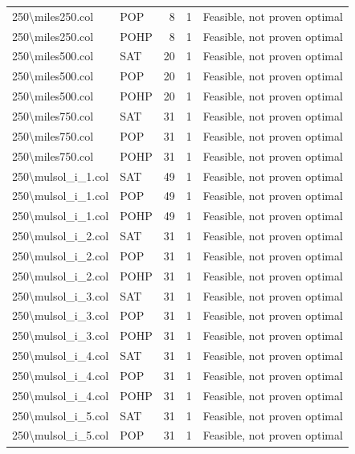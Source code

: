 \begin{longtable}{llrrl}
250\textbackslash{}miles250.col & POP & 8 & 1 & Feasible, not proven optimal \\
250\textbackslash{}miles250.col & POHP & 8 & 1 & Feasible, not proven optimal \\
250\textbackslash{}miles500.col & SAT & 20 & 1 & Feasible, not proven optimal \\
250\textbackslash{}miles500.col & POP & 20 & 1 & Feasible, not proven optimal \\
250\textbackslash{}miles500.col & POHP & 20 & 1 & Feasible, not proven optimal \\
250\textbackslash{}miles750.col & SAT & 31 & 1 & Feasible, not proven optimal \\
250\textbackslash{}miles750.col & POP & 31 & 1 & Feasible, not proven optimal \\
250\textbackslash{}miles750.col & POHP & 31 & 1 & Feasible, not proven optimal \\
250\textbackslash{}mulsol\_i\_1.col & SAT & 49 & 1 & Feasible, not proven optimal \\
250\textbackslash{}mulsol\_i\_1.col & POP & 49 & 1 & Feasible, not proven optimal \\
250\textbackslash{}mulsol\_i\_1.col & POHP & 49 & 1 & Feasible, not proven optimal \\
250\textbackslash{}mulsol\_i\_2.col & SAT & 31 & 1 & Feasible, not proven optimal \\
250\textbackslash{}mulsol\_i\_2.col & POP & 31 & 1 & Feasible, not proven optimal \\
250\textbackslash{}mulsol\_i\_2.col & POHP & 31 & 1 & Feasible, not proven optimal \\
250\textbackslash{}mulsol\_i\_3.col & SAT & 31 & 1 & Feasible, not proven optimal \\
250\textbackslash{}mulsol\_i\_3.col & POP & 31 & 1 & Feasible, not proven optimal \\
250\textbackslash{}mulsol\_i\_3.col & POHP & 31 & 1 & Feasible, not proven optimal \\
250\textbackslash{}mulsol\_i\_4.col & SAT & 31 & 1 & Feasible, not proven optimal \\
250\textbackslash{}mulsol\_i\_4.col & POP & 31 & 1 & Feasible, not proven optimal \\
250\textbackslash{}mulsol\_i\_4.col & POHP & 31 & 1 & Feasible, not proven optimal \\
250\textbackslash{}mulsol\_i\_5.col & SAT & 31 & 1 & Feasible, not proven optimal \\
250\textbackslash{}mulsol\_i\_5.col & POP & 31 & 1 & Feasible, not proven optimal \\

\end{longtable}

